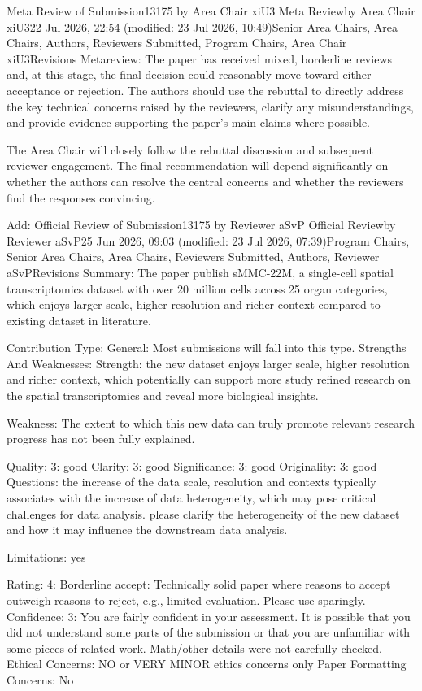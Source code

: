 Meta Review of Submission13175 by Area Chair xiU3
Meta Reviewby Area Chair xiU322 Jul 2026, 22:54 (modified: 23 Jul 2026, 10:49)Senior Area Chairs, Area Chairs, Authors, Reviewers Submitted, Program Chairs, Area Chair xiU3Revisions
Metareview:
The paper has received mixed, borderline reviews and, at this stage, the final decision could reasonably move toward either acceptance or rejection. The authors should use the rebuttal to directly address the key technical concerns raised by the reviewers, clarify any misunderstandings, and provide evidence supporting the paper’s main claims where possible.

The Area Chair will closely follow the rebuttal discussion and subsequent reviewer engagement. The final recommendation will depend significantly on whether the authors can resolve the central concerns and whether the reviewers find the responses convincing.

Add:
Official Review of Submission13175 by Reviewer aSvP
Official Reviewby Reviewer aSvP25 Jun 2026, 09:03 (modified: 23 Jul 2026, 07:39)Program Chairs, Senior Area Chairs, Area Chairs, Reviewers Submitted, Authors, Reviewer aSvPRevisions
Summary:
The paper publish sMMC-22M, a single-cell spatial transcriptomics dataset with over 20 million cells across 25 organ categories, which enjoys larger scale, higher resolution and richer context compared to existing dataset in literature.

Contribution Type: General: Most submissions will fall into this type.
Strengths And Weaknesses:
Strength: the new dataset enjoys larger scale, higher resolution and richer context, which potentially can support more study refined research on the spatial transcriptomics and reveal more biological insights.

Weakness: The extent to which this new data can truly promote relevant research progress has not been fully explained.

Quality: 3: good
Clarity: 3: good
Significance: 3: good
Originality: 3: good
Questions:
the increase of the data scale, resolution and contexts typically associates with the increase of data heterogeneity, which may pose critical challenges for data analysis. please clarify the heterogeneity of the new dataset and how it may influence the downstream data analysis.

Limitations:
yes

Rating: 4: Borderline accept: Technically solid paper where reasons to accept outweigh reasons to reject, e.g., limited evaluation. Please use sparingly.
Confidence: 3: You are fairly confident in your assessment. It is possible that you did not understand some parts of the submission or that you are unfamiliar with some pieces of related work. Math/other details were not carefully checked.
Ethical Concerns: NO or VERY MINOR ethics concerns only
Paper Formatting Concerns:
No

